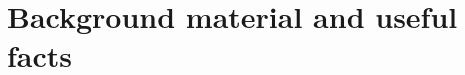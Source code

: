 \documentclass[11pt,a4paper]{article}
\newtheorem{exercise}{Exercise}
\begin{document}
	
	\section{Background material and useful facts}			%
	\label{sec:background}
\end{document}
